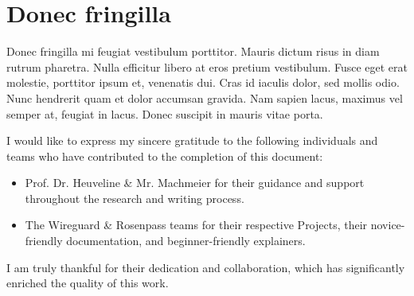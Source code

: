 \documentclass[sigconf]{acmart}
\begin{document}
\section{Donec fringilla}
Donec fringilla mi feugiat vestibulum porttitor. Mauris dictum risus in diam rutrum pharetra. Nulla efficitur libero at eros pretium vestibulum. Fusce eget erat molestie, porttitor ipsum et, venenatis dui. Cras id iaculis dolor, sed mollis odio. Nunc hendrerit quam et dolor accumsan gravida. Nam sapien lacus, maximus vel semper at, feugiat in lacus. Donec suscipit in mauris vitae porta.\cite{cryptoeprint:2016/1017}

\begin{acks}
I would like to express my sincere gratitude to the following individuals and teams who have contributed to the completion of this document:

\begin{itemize}
  \item Prof. Dr. Heuveline \& Mr. Machmeier for their guidance and support throughout the research and writing process.
  \item The Wireguard \& Rosenpass teams for their respective Projects, their novice-friendly documentation, and beginner-friendly explainers.
\end{itemize}

I am truly thankful for their dedication and collaboration, which has significantly enriched the quality of this work.
\end{acks}





\end{document}
